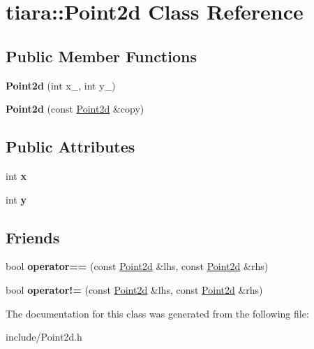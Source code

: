 \hypertarget{classtiara_1_1Point2d}{}\section{tiara\+::Point2d Class Reference}
\label{classtiara_1_1Point2d}
\subsection*{Public Member Functions}
\begin{DoxyCompactItemize}
\item 
\mbox{\label{classtiara_1_1Point2d_a0569b631f8dcde02a1de5b105d02d174}} 
{\bfseries Point2d} (int x\+\_, int y\+\_)
\item 
\mbox{\label{classtiara_1_1Point2d_a72fb8220c0150a37f1861425c80ed865}} 
{\bfseries Point2d} (const \mbox{\hyperlink{classtiara_1_1Point2d}{Point2d}} \&copy)
\end{DoxyCompactItemize}
\subsection*{Public Attributes}
\begin{DoxyCompactItemize}
\item 
\mbox{\label{classtiara_1_1Point2d_abc5f86effac4ca92555b6267f11809fd}} 
int {\bfseries x}
\item 
\mbox{\label{classtiara_1_1Point2d_a87629184aebad96f6500423cab6dbaa9}} 
int {\bfseries y}
\end{DoxyCompactItemize}
\subsection*{Friends}
\begin{DoxyCompactItemize}
\item 
\mbox{\label{classtiara_1_1Point2d_ab68bc9f2def771b2d1f66e9ee743a6e6}} 
bool {\bfseries operator==} (const \mbox{\hyperlink{classtiara_1_1Point2d}{Point2d}} \&lhs, const \mbox{\hyperlink{classtiara_1_1Point2d}{Point2d}} \&rhs)
\item 
\mbox{\label{classtiara_1_1Point2d_a83e99ffcac820a3403d7a67de3ef6693}} 
bool {\bfseries operator!=} (const \mbox{\hyperlink{classtiara_1_1Point2d}{Point2d}} \&lhs, const \mbox{\hyperlink{classtiara_1_1Point2d}{Point2d}} \&rhs)
\end{DoxyCompactItemize}


The documentation for this class was generated from the following file\+:\begin{DoxyCompactItemize}
\item 
include/Point2d.\+h\end{DoxyCompactItemize}
